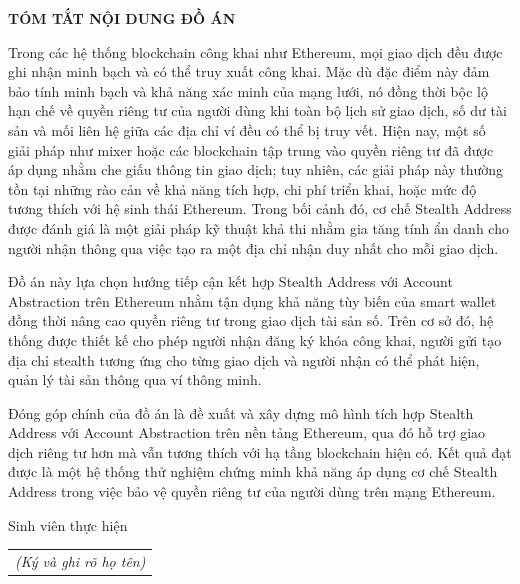 \begin{center}
    \Large{\textbf{TÓM TẮT NỘI DUNG ĐỒ ÁN}}\\
\end{center}
\vspace{1cm}

Trong các hệ thống blockchain công khai như Ethereum, mọi giao dịch đều được ghi nhận minh bạch và có thể truy xuất công khai. Mặc dù đặc điểm này đảm bảo tính minh bạch và khả năng xác minh của mạng lưới, nó đồng thời bộc lộ hạn chế về quyền riêng tư của người dùng khi toàn bộ lịch sử giao dịch, số dư tài sản và mối liên hệ giữa các địa chỉ ví đều có thể bị truy vết. Hiện nay, một số giải pháp như mixer hoặc các blockchain tập trung vào quyền riêng tư đã được áp dụng nhằm che giấu thông tin giao dịch; tuy nhiên, các giải pháp này thường tồn tại những rào cản về khả năng tích hợp, chi phí triển khai, hoặc mức độ tương thích với hệ sinh thái Ethereum. Trong bối cảnh đó, cơ chế Stealth Address được đánh giá là một giải pháp kỹ thuật khả thi nhằm gia tăng tính ẩn danh cho người nhận thông qua việc tạo ra một địa chỉ nhận duy nhất cho mỗi giao dịch.

Đồ án này lựa chọn hướng tiếp cận kết hợp Stealth Address với Account Abstraction trên Ethereum nhằm tận dụng khả năng tùy biến của smart wallet đồng thời nâng cao quyền riêng tư trong giao dịch tài sản số. Trên cơ sở đó, hệ thống được thiết kế cho phép người nhận đăng ký khóa công khai, người gửi tạo địa chỉ stealth tương ứng cho từng giao dịch và người nhận có thể phát hiện, quản lý tài sản thông qua ví thông minh.

Đóng góp chính của đồ án là đề xuất và xây dựng mô hình tích hợp Stealth Address với Account Abstraction trên nền tảng Ethereum, qua đó hỗ trợ giao dịch riêng tư hơn mà vẫn tương thích với hạ tầng blockchain hiện có. Kết quả đạt được là một hệ thống thử nghiệm chứng minh khả năng áp dụng cơ chế Stealth Address trong việc bảo vệ quyền riêng tư của người dùng trên mạng Ethereum.

\begin{flushright}
Sinh viên thực hiện\\
\begin{tabular}{@{}c@{}}
\textit{(Ký và ghi rõ họ tên)}
\end{tabular}
\end{flushright}